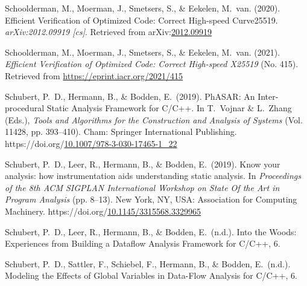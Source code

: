 \documentclass[12pt,twoside]{article}
\begin{document}
{\begin{thebibliography}{1079}
\mdbibitemlabel{}Schoolderman, M., Moerman, J., Smetsers, S., \& Eekelen, M.~van. (2020). Efficient Verification of Optimized Code: Correct High-speed Curve25519. \emph{arXiv:2012.09919 {}[cs]}. Retrieved from arXiv:\href{http://arxiv.org/abs/2012.09919}{2012.09919}%

\mdbibitemlabel{}Schoolderman, M., Moerman, J., Smetsers, S., \& Eekelen, M.~van. (2021). \emph{Efficient Verification of Optimized Code: Correct High-speed X25519} (No. 415). Retrieved from \href{https://eprint.iacr.org/2021/415}{{\ttfamily https://\hspace{0pt}eprint.\hspace{0pt}iacr.\hspace{0pt}org/\hspace{0pt}2021/\hspace{0pt}415}}%

\mdbibitemlabel{}Schubert, P.~D., Hermann, B., \& Bodden, E.~(2019). PhASAR: An Inter-procedural Static Analysis Framework for C/C++. In T.~Vojnar \& L.~Zhang (Eds.), \emph{Tools and Algorithms for the Construction and Analysis of Systems} (Vol. 11428, pp. 393–410). Cham: Springer International Publishing. https://doi.org/\href{https://dx.doi.org/10.1007/978-3-030-17465-1_22}{10.1007/978-3-030-17465-1\_22}%

\mdbibitemlabel{}Schubert, P.~D., Leer, R., Hermann, B., \& Bodden, E.~(2019). Know your analysis: how instrumentation aids understanding static analysis. In \emph{Proceedings of the 8th ACM SIGPLAN International Workshop on State Of the Art in Program Analysis} (pp. 8–13). New York, NY, USA: Association for Computing Machinery. https://doi.org/\href{https://dx.doi.org/10.1145/3315568.3329965}{10.1145/3315568.3329965}%

\mdbibitemlabel{}Schubert, P.~D., Leer, R., Hermann, B., \& Bodden, E.~(n.d.). Into the Woods: Experiences from Building a Dataﬂow Analysis Framework for C/C++, 6.%

\mdbibitemlabel{}Schubert, P.~D., Sattler, F., Schiebel, F., Hermann, B., \& Bodden, E.~(n.d.). Modeling the Effects of Global Variables in Data-Flow Analysis for C/C++, 6.%


\end{thebibliography}}
\end{document}

